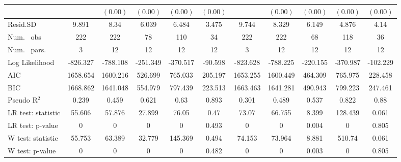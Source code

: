 \begin{table}
\begin{center}
\begin{tabular}{l c c c c c c c c c c}
                                  &               & $(0.00)$      & $(0.00)$      & $(0.00)$     & $(0.00)$      &               & $(0.00)$      & $(0.00)$      & $(0.00)$     & $(0.00)$      \\
\hline
Resid.SD                          & 9.891         & 8.34          & 6.039         & 6.484        & 3.475         & 9.744         & 8.329         & 6.149         & 4.876        & 4.14          \\
Num. \ obs                        & 222           & 222           & 78            & 110          & 34            & 222           & 222           & 68            & 118          & 36            \\
Num. \ pars.                      & 3             & 12            & 12            & 12           & 12            & 3             & 12            & 12            & 12           & 12            \\
Log Likelihood                    & -826.327      & -788.108      & -251.349      & -370.517     & -90.598       & -823.628      & -788.225      & -220.155      & -370.987     & -102.229      \\
AIC                               & 1658.654      & 1600.216      & 526.699       & 765.033      & 205.197       & 1653.255      & 1600.449      & 464.309       & 765.975      & 228.458       \\
BIC                               & 1668.862      & 1641.048      & 554.979       & 797.439      & 223.513       & 1663.463      & 1641.281      & 490.943       & 799.223      & 247.461       \\
Pseudo R$^2$                      & 0.239         & 0.459         & 0.621         & 0.63         & 0.893         & 0.301         & 0.489         & 0.537         & 0.822        & 0.88          \\
LR test: statistic                & 55.606        & 57.876        & 27.899        & 76.05        & 0.47          & 73.07         & 66.755        & 8.399         & 128.439      & 0.061         \\
LR test: p-value                  & 0             & 0             & 0             & 0            & 0.493         & 0             & 0             & 0.004         & 0            & 0.805         \\
W test: statistic                 & 55.753        & 63.389        & 32.779        & 145.369      & 0.494         & 74.153        & 73.964        & 8.881         & 510.74       & 0.061         \\
W test: p-value                   & 0             & 0             & 0             & 0            & 0.482         & 0             & 0             & 0.003         & 0            & 0.805         \\

\end{tabular}
\end{center}
\end{table}
